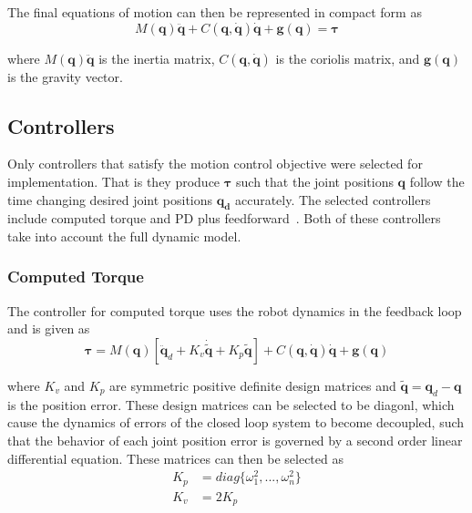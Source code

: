 \documentclass[conference]{IEEEtran}
\begin{document}
The final equations of motion can then be represented in compact form as
\begin{equation*}
  M(\boldsymbol{q})\ddot{\boldsymbol{q}} + C(\boldsymbol{q}, \dot{\boldsymbol{q}})\dot{\boldsymbol{q}} + \boldsymbol{g}(\boldsymbol{q}) = \boldsymbol{\tau}
\end{equation*}

where $M(\boldsymbol{q})\ddot{\boldsymbol{q}}$ is the inertia matrix,
$C(\boldsymbol{q}, \dot{\boldsymbol{q}})$ is the coriolis matrix, and
$\boldsymbol{g}(\boldsymbol{q})$ is the gravity vector.

\subsection{Controllers}
Only controllers that satisfy the motion control objective were selected for
implementation. That is they produce $\boldsymbol{\tau}$ such that the joint
positions $\boldsymbol{q}$ follow the time changing desired joint positions
$\boldsymbol{q_d}$ accurately. The selected controllers include computed torque
and PD plus feedforward~\cite{kelly2007control}. Both of these controllers take into account the full
dynamic model.

\subsubsection{Computed Torque}
The controller for computed torque uses the robot dynamics in the feedback loop
and is given as
\begin{equation*}
  \boldsymbol{\tau} = M(\boldsymbol{q}) \left [ \ddot{\boldsymbol{q}}_d + K_v \dot{\tilde{\boldsymbol{q}}} + K_p \tilde{\boldsymbol{q}} \right ] + C(\boldsymbol{q}, \dot{\boldsymbol{q}})\dot{\boldsymbol{q}} + \boldsymbol{g}(\boldsymbol{q})
\end{equation*}

where $K_v$ and $K_p$ are symmetric positive definite design matrices and
$\tilde{\boldsymbol{q}} = \boldsymbol{q}_d - \boldsymbol{q}$ is the position
error. These design matrices can be selected to be diagonl, which cause the
dynamics of errors of the closed loop system to become decoupled, such that the
behavior of each joint position error is governed by a second order linear
differential equation. These matrices can then be selected as
\begin{align*}
  K_p &= diag\{\omega_1^2, ... , \omega_n^2\} \\
  K_v &= 2 K_p
\end{align*}
\end{document}
